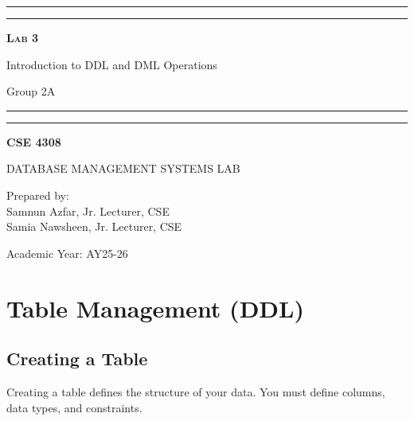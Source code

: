 \documentclass[12pt,a4paper]{article}
\begin{document}
\begin{titlepage}
    \centering
    \vspace*{2\baselineskip}

    \rule{14cm}{2pt}\vspace*{-0.8\baselineskip}\vspace*{1.5pt}
    \rule{14cm}{0.5pt}\vspace{2\baselineskip}

    {\Huge\bfseries\scshape Lab 3\par}
    \vspace{3mm}
    {\Large Introduction to DDL and DML Operations\par}
    \vspace{2mm}
    {\large Group 2A\par}
    \vspace{3mm}

    \rule{14cm}{0.5pt}\vspace*{-0.7\baselineskip}\vspace{2.5pt}
    \rule{14cm}{2pt}

    \vspace{2\baselineskip}

    {\Large\bfseries CSE 4308\par}
    \vspace{1\baselineskip}
    {\large DATABASE MANAGEMENT SYSTEMS LAB\par}

    \vfill
    {\normalsize Prepared by:\\ Samnun Azfar, Jr. Lecturer, CSE\\ Samia Nawsheen, Jr. Lecturer, CSE\par}
    {\normalsize Academic Year: AY25-26\par}
\end{titlepage}

\newpage

\section{Table Management (DDL)}

\subsection{Creating a Table}
Creating a table defines the structure of your data. You must define columns, data types, and constraints.
\end{document}
